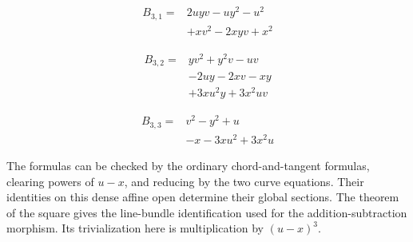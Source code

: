 \[
\begin{aligned}
B_{3,1}={}&2uyv-uy^{2}-u^{2}\\
&+xv^{2}-2xyv+x^{2}
\end{aligned}
\]

\[
\begin{aligned}
B_{3,2}={}&yv^{2}+y^{2}v-uv\\
&-2uy-2xv-xy\\
&+3xu^{2}y+3x^{2}uv
\end{aligned}
\]

\[
\begin{aligned}
B_{3,3}={}&v^{2}-y^{2}+u\\
&-x-3xu^{2}+3x^{2}u
\end{aligned}
\]

The formulas can be checked by the ordinary chord-and-tangent formulas,
clearing powers of $u-x$, and reducing by the two curve equations.
Their identities on this dense affine open determine their global
sections. The theorem of the square gives the line-bundle identification
used for the addition-subtraction morphism. Its trivialization here is
multiplication by $(u-x)^3$.



